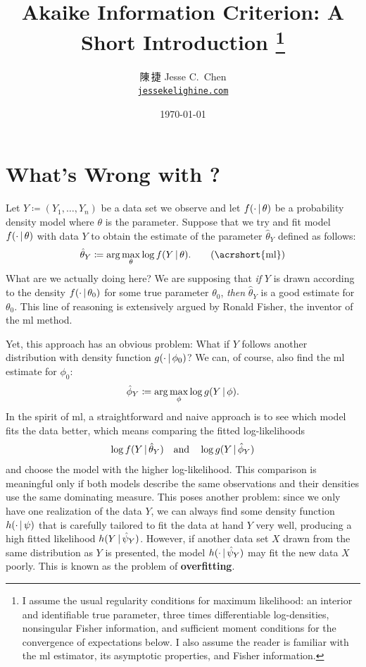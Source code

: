 \documentclass[a4paper,12pt]{article}
\title{Akaike Information Criterion: A Short Introduction%
\footnote{I assume the usual regularity conditions for maximum likelihood:
an interior and identifiable true parameter, three times differentiable log-densities,
nonsingular Fisher information, and sufficient moment conditions for the convergence of expectations below.
I also assume the reader is familiar with the \acrshort{ml} estimator, its asymptotic properties, and Fisher information.}}
\author{陳\,捷 Jesse C.\ Chen\\\texttt{\href{https://jessekelighine.com}{jessekelighine.com}}}
\date{\today}
\begin{document}
\maketitle

\section{What's Wrong with ?}

\noindent
Let $Y\coloneqq(Y_{1},\ldots,Y_n)$ be a data set we observe and
let $f(\cdot\,|\,\theta)$ be a probability density model where $\theta$ is the parameter.
Suppose that we try and fit model $f(\cdot\,|\,\theta)$ with data $Y$ to obtain the estimate of the parameter $\hat\theta_Y$ defined as follows:
\begin{align}
	\hat\theta_{Y} \coloneqq \arg\max_{\theta} \log f(Y\given\theta). \tag{\acrshort{ml}}
\end{align}
What are we actually doing here?
We are supposing that \emph{if} $Y$ is drawn according to the density $f(\cdot\,|\,\theta_{0})$ for some true parameter $\theta_0$,
\emph{then} $\hat\theta_{Y}$ is a good estimate for $\theta_{0}$.
This line of reasoning is extensively argued by Ronald Fisher, the inventor of the \gls{ml} method.

Yet, this approach has an obvious problem:
What if $Y$ follows another distribution with density function $g(\cdot\,|\,\phi_{0})$?
We can, of course, also find the \gls{ml} estimate for $\phi_{0}$:
\begin{align*}
	\hat\phi_{Y} \coloneqq \arg\max_{\phi} \log g(Y\,|\,\phi).
\end{align*}
In the spirit of \gls{ml},
a straightforward and naive approach is to see which model fits the data better,
which means comparing the fitted log-likelihoods
\begin{align}\label{eq:ml-compare}
	\log f(Y\,|\,\hat\theta_{Y})
	\quad\text{and}\quad
	\log g(Y\,|\,\hat\phi_{Y})
\end{align}
and choose the model with the higher log-likelihood.
This comparison is meaningful only if both models describe the same observations and
their densities use the same dominating measure.
This poses another problem:
since we only have one realization of the data $Y$,
we can always find some density function $h(\cdot\,|\,\psi)$ that is carefully tailored to fit the data at hand $Y$ very well,
producing a high fitted likelihood $h(Y\,|\,\hat\psi_{Y})$.
However, if another data set $X$ drawn from the same distribution as $Y$ is presented,
the model $h(\cdot\,|\,\hat\psi_Y)$ may fit the new data $X$ poorly.
This is known as the problem of \textbf{overfitting}.
\end{document}
